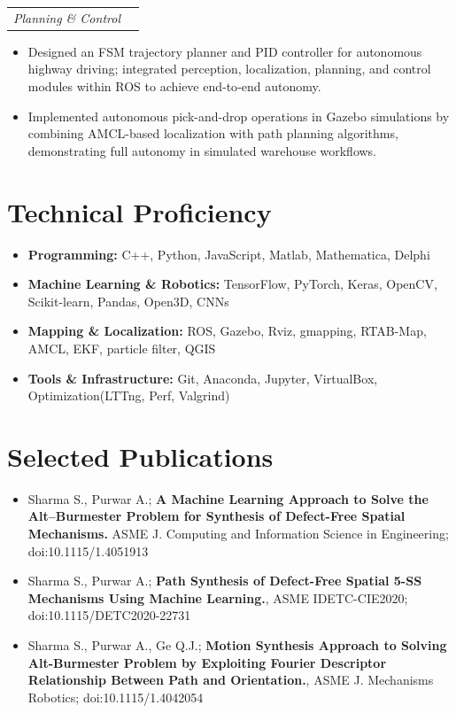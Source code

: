 \documentclass[letterpaper,10pt]{article}
\makeatletter
\newcommand{\resumeSubheading}[2]{%
  \begin{tabular*}{\textwidth}{l@{\extracolsep{\fill}}r}
    \textit{\small #1} & \textit{\small #2}
  \end{tabular*}%
}
\newcommand{\resumeItem}[1]{\item\small #1}
\makeatother
\begin{document}
\resumeSubheading{Planning \& Control}{}
\begin{itemize}
\resumeItem{Designed an FSM trajectory planner and PID controller for autonomous highway driving; integrated perception, localization, planning, and control modules within ROS to achieve end‑to‑end autonomy.}
\resumeItem{Implemented autonomous pick-and-drop operations in Gazebo simulations by combining AMCL-based localization with path planning algorithms, demonstrating full autonomy in simulated warehouse workflows.}
\end{itemize}



\section{Technical Proficiency}
\begin{itemize}
\resumeItem{\textbf{Programming:} C++, Python, JavaScript, Matlab, Mathematica, Delphi}
\resumeItem{\textbf{Machine Learning \& Robotics:} TensorFlow, PyTorch, Keras, OpenCV, Scikit-learn, Pandas, Open3D, CNNs}
\resumeItem{\textbf{Mapping \& Localization:} ROS, Gazebo, Rviz, gmapping, RTAB-Map, AMCL, EKF, particle filter, QGIS}
\resumeItem{\textbf{Tools \& Infrastructure:} Git, Anaconda, Jupyter, VirtualBox, Optimization(LTTng, Perf, Valgrind)}
\end{itemize}


\section{Selected Publications}
\begin{itemize}
\resumeItem{Sharma S., Purwar A.; \textbf{A Machine Learning Approach to Solve the Alt–Burmester Problem for Synthesis of Defect-Free Spatial Mechanisms.} ASME J. Computing and Information Science in Engineering; doi:10.1115/1.4051913}
\resumeItem{Sharma S., Purwar A.; \textbf{Path Synthesis of Defect-Free Spatial 5-SS Mechanisms Using Machine Learning.}, ASME IDETC-CIE2020; doi:10.1115/DETC2020-22731}
\resumeItem{Sharma S., Purwar A., Ge Q.J.; \textbf{Motion Synthesis Approach to Solving Alt-Burmester Problem by Exploiting Fourier Descriptor Relationship Between Path and Orientation.}, ASME J. Mechanisms Robotics; doi:10.1115/1.4042054}
\end{itemize}
\end{document}
